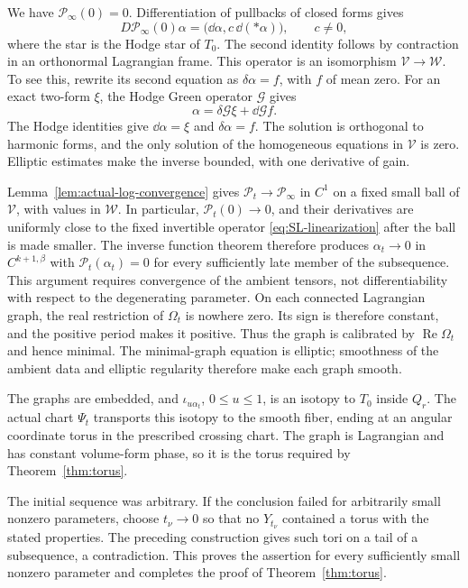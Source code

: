 We have $\mathcal P_\infty(0)=0$. Differentiation of pullbacks of
closed forms gives
\begin{equation}\label{eq:SL-linearization}
 D\mathcal P_\infty(0)\alpha
       =\bigl(\dd\alpha,c\,\dd(*\alpha)\bigr),\qquad c\ne0,
\end{equation}
where the star is the Hodge star of $T_0$. The second identity follows
by contraction in an orthonormal Lagrangian frame. This operator is
an isomorphism $\mathcal V\to\mathcal W$. To see this, rewrite its
second equation as $\delta\alpha=f$, with $f$ of mean zero. For an
exact two-form $\xi$, the Hodge Green operator $\mathcal G$ gives
\[
                \alpha=\delta\mathcal G\xi+\dd\mathcal Gf.
\]
The Hodge identities give $\dd\alpha=\xi$ and $\delta\alpha=f$.
The solution is orthogonal to harmonic forms, and the only solution
of the homogeneous equations in $\mathcal V$ is zero. Elliptic
estimates make the inverse bounded, with one derivative of gain.

Lemma~\ref{lem:actual-log-convergence} gives
$\mathcal P_t\to\mathcal P_\infty$ in $C^1$ on a fixed small ball of
$\mathcal V$, with values in $\mathcal W$. In particular,
$\mathcal P_t(0)\to0$, and their derivatives are uniformly close to
the fixed invertible operator \eqref{eq:SL-linearization} after the
ball is made smaller. The inverse function theorem therefore produces
$\alpha_t\to0$ in $C^{k+1,\beta}$ with $\mathcal P_t(\alpha_t)=0$
for every sufficiently late member of the subsequence. This argument
requires convergence of the ambient tensors, not differentiability
with respect to the degenerating parameter. On each connected
Lagrangian graph, the real restriction of
$\Omega_t$ is nowhere zero. Its sign is therefore constant, and
the positive period makes it positive. Thus the graph is calibrated
by $\operatorname{Re}\Omega_t$ and hence minimal. The
minimal-graph equation is elliptic; smoothness of the ambient data
and elliptic regularity therefore make each graph smooth.

The graphs are embedded, and $\iota_{u\alpha_t}$, $0\le u\le1$,
is an isotopy to $T_0$ inside $Q_r$. The actual chart $\Psi_t$
transports this isotopy to the smooth fiber, ending at an angular
coordinate torus in the prescribed crossing chart. The graph is
Lagrangian and has constant volume-form phase, so it is the torus
required by Theorem~\ref{thm:torus}.

The initial sequence was arbitrary. If the conclusion failed for
arbitrarily small nonzero parameters, choose $t_\nu\to0$ so that no
$Y_{t_\nu}$ contained a torus with the stated properties. The preceding
construction gives such tori on a tail of a subsequence, a contradiction.
This proves the assertion for every sufficiently small nonzero
parameter and completes the proof of Theorem~\ref{thm:torus}.
